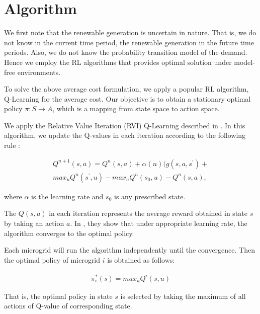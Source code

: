 \section{Algorithm}
We first note that the renewable generation is uncertain in nature. That is, we do not know in the current time period, the renewable generation in the future time periods. Also, we do not know the probability transition model of the demand. Hence we employ the RL algorithms that provides optimal solution under model-free environments.

To solve the above average cost formulation, we apply a popular RL algorithm, Q-Learning for the average cost. Our objective is to obtain a stationary optimal policy $\pi : S \rightarrow A$, which is a mapping from state space to action space.  

We apply the Relative Value Iteration (RVI) Q-Learning described in \cite{avgcost}. In this algorithm, we update the Q-values in each iteration according to the following rule :

\begin{align}
Q^{n+1}(s,a) = Q^{n}(s,a) + \alpha(n)(g(s,a,s^{'}) + \\ max_{u} Q^{n}(s^{'},u) - max_{u} Q^{n}(s_{0},u) - Q^{n}(s,a),
\end{align}

where $\alpha$ is the learning rate and $s_{0}$ is any prescribed state.

The $Q(s,a)$ in each iteration represents the average reward obtained in state $s$ by taking an action $a$. In \cite{avgcost}, they show that under appropriate learning rate, the algorithm converges to the  optimal policy. 

Each microgrid will run the algorithm independently until the convergence. Then the optimal policy of microgrid $i$ is obtained as follows:

\begin{align}
\pi_{i}^{*}(s) = max_{u}Q^{i}(s,u)
\end{align}

That is, the optimal policy in state $s$ is selected by taking the maximum of all actions of Q-value of corresponding state. 

